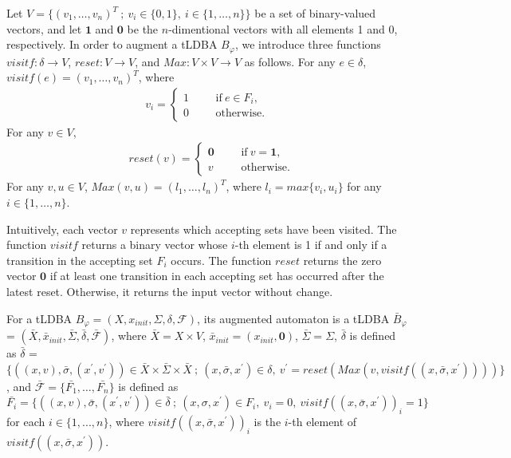 \documentclass[a4j,12pt,oneside,openany,english]{jsbook}
\begin{document}
Let $V = \{ (v_1, \ldots ,v_n)^T\ ;\ v_i \in \{ 0,1 \},\ i \in \{ 1, \ldots ,n \} \}$ be a set of binary-valued vectors, and let $\bm{1}$ and $\bm{0}$ be the $n$-dimentional vectors with all elements 1 and 0, respectively.
In order to augment a tLDBA $B_{\varphi}$, we introduce three functions $visitf:\delta \rightarrow V$, $reset:V \rightarrow V$, and $Max:V\times V \rightarrow V$ as follows.
For any $e \in \delta$, $visitf(e) = (v_1, \ldots ,v_n)^T$, where %
\begin{align}
 v_i =
  \left\{
  \begin{aligned}
    1 &   & &\text{if}\ e\in F_i, \\
    0 &   & &\text{otherwise}.
  \end{aligned}
  \right. \nonumber
\end{align}
For any $v \in V$, %
\begin{align}
  &reset(v) =
  \left\{
  \begin{aligned}
    \bm{0} &   & &\text{if}\  v = \bm{1},\\
    v &   & &\text{otherwise}.
  \end{aligned}
  \right. \nonumber
\end{align}
For any $v,u \in V$, $Max(v,u) = (l_1,\ldots ,l_n)^T$, where $l_i = max\{v_i, u_i\} $ for any $i\in \{1, \ldots ,n\}$.

Intuitively, each vector $v$ represents which accepting sets have been visited. The function $visitf$ returns a binary vector whose $i$-th element is 1 if and only if a transition in the accepting set $F_i$ occurs. The function $reset$ returns the zero vector $\bm{0}$ if at least one transition in each accepting set has occurred after the latest reset. Otherwise, it returns the input vector without change.

\begin{definition}
   For a tLDBA $B_{\varphi} = (X,x_{init},\Sigma,\delta,\mathcal{F})$, its augmented automaton is a tLDBA $\bar{B}_{\varphi}$ = $(\bar{X},\bar{x}_{init},\bar{\Sigma},\bar{\delta},\bar{\mathcal{F}})$, where $\bar{X} = X\times V$, $\bar{x}_{init} = (x_{init}, \bm{0})$, $\bar{\Sigma} = \Sigma$, $\bar{\delta}$ is defined as $\bar{\delta}$ = $\{ ((x,v), \bar{\sigma}, (x^{\prime},v^{\prime})) \in \bar{X} \times \bar{\Sigma} \times \bar{X}\ ;\ (x,\bar{\sigma},x^{\prime}) \in \delta,\ v^{\prime} = reset(Max(v,visitf((x,\bar{\sigma},x^{\prime})))) \}$, and $\mathcal{\bar{F}} = \{ \bar{F_1}, \ldots ,\bar{F_n} \}$ is defined as $\bar{F_i} = \{ ((x,v), \bar{\sigma}, (x^{\prime},v^{\prime})) \in \bar{\delta}\ ;\ (x, \sigma, x^{\prime}) \in F_i,\ v_i = 0,\ visitf((x, \bar{\sigma}, x^{\prime}))_i = 1\}$ for each $ i \in \{1,...,n\}$, where $visitf((x, \bar{\sigma}, x^{\prime}))_i$ is the $i$-th element of $visitf((x, \bar{\sigma}, x^{\prime}))$.
\end{definition}
\end{document}
